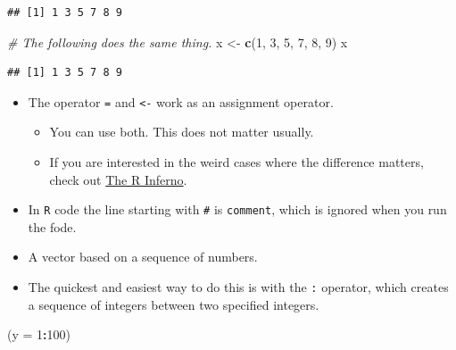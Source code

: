 \documentclass[]{book}
\newenvironment{Shaded}{\begin{snugshade}}{\end{snugshade}}
\newcommand{\KeywordTok}[1]{\textcolor[rgb]{0.13,0.29,0.53}{\textbf{#1}}}
\newcommand{\DataTypeTok}[1]{\textcolor[rgb]{0.13,0.29,0.53}{#1}}
\newcommand{\DecValTok}[1]{\textcolor[rgb]{0.00,0.00,0.81}{#1}}
\newcommand{\StringTok}[1]{\textcolor[rgb]{0.31,0.60,0.02}{#1}}
\newcommand{\CommentTok}[1]{\textcolor[rgb]{0.56,0.35,0.01}{\textit{#1}}}
\newcommand{\OperatorTok}[1]{\textcolor[rgb]{0.81,0.36,0.00}{\textbf{#1}}}
\newcommand{\NormalTok}[1]{#1}
\providecommand{\tightlist}{%
  \setlength{\itemsep}{0pt}\setlength{\parskip}{0pt}}
\begin{document}
\begin{verbatim}
## [1] 1 3 5 7 8 9
\end{verbatim}

\begin{Shaded}
\begin{Highlighting}[]
\CommentTok{# The following does the same thing.}
\NormalTok{x <-}\StringTok{ }\KeywordTok{c}\NormalTok{(}\DecValTok{1}\NormalTok{, }\DecValTok{3}\NormalTok{, }\DecValTok{5}\NormalTok{, }\DecValTok{7}\NormalTok{, }\DecValTok{8}\NormalTok{, }\DecValTok{9}\NormalTok{)}
\NormalTok{x}
\end{Highlighting}
\end{Shaded}

\begin{verbatim}
## [1] 1 3 5 7 8 9
\end{verbatim}

\begin{itemize}
\tightlist
\item
  The operator \texttt{=} and \texttt{\textless{}-} work as an
  assignment operator.

  \begin{itemize}
  \tightlist
  \item
    You can use both. This does not matter usually.
  \item
    If you are interested in the weird cases where the difference
    matters, check out
    \href{http://www.burns-stat.com/documents/books/the-r-inferno/}{The
    R Inferno}.
  \end{itemize}
\item
  In \texttt{R} code the line starting with \texttt{\#} is
  \texttt{comment}, which is ignored when you run the fode.
\end{itemize}

\begin{itemize}
\tightlist
\item
  A vector based on a sequence of numbers.
\item
  The quickest and easiest way to do this is with the \texttt{:}
  operator, which creates a sequence of integers between two specified
  integers.
\end{itemize}

\begin{Shaded}
\begin{Highlighting}[]
\NormalTok{(}\DataTypeTok{y =} \DecValTok{1}\OperatorTok{:}\DecValTok{100}\NormalTok{)}
\end{Highlighting}
\end{Shaded}
\end{document}
